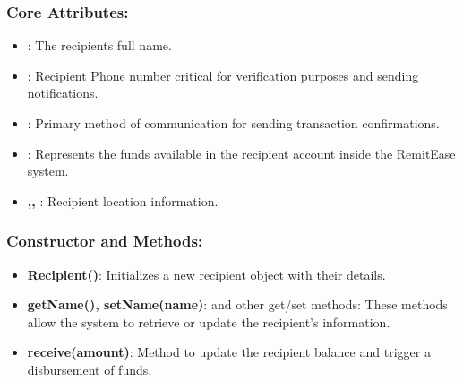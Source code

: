 \documentclass[onecolumn, letterpaper, ]{report}
\begin{document}
            \subsubsection{Core Attributes:}
            \begin{itemize}
               \item \textbf{}: The recipients full name.
                \item \textbf{}: Recipient Phone number critical for verification purposes and sending notifications.
                \item \textbf{}: Primary method of communication for sending transaction confirmations.
                \item \textbf{}: Represents the funds available in the recipient account inside the RemitEase system.
                \item \textbf{,, }: Recipient location information. 
            \end{itemize}

            \subsubsection{Constructor and Methods:}
            \begin{itemize}
                \item \textbf{Recipient()}: Initializes a new recipient object with their details.
                \item \textbf{getName(), setName(name)}: and other get/set methods: These methods allow the system to retrieve or update the recipient's information. 
                \item \textbf{receive(amount)}: Method to update the recipient balance and trigger a disbursement of funds.
            \end{itemize}
\end{document}

